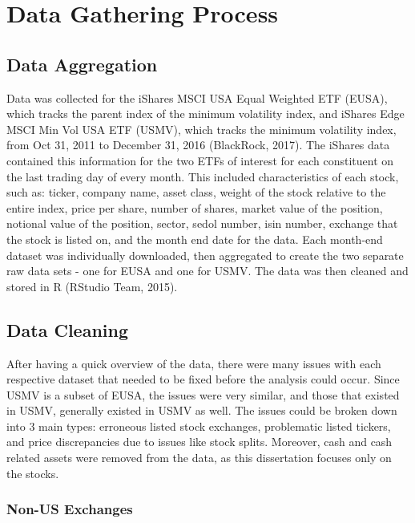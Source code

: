 \documentclass[12pt,twoside]{reedthesis}
\theoremstyle{definition}
\theoremstyle{definition}
\theoremstyle{definition}
\theoremstyle{remark}
\begin{document}
\chapter{Data Gathering Process}\label{data-gathering-process}

\section{Data Aggregation}\label{data-aggregation}

Data was collected for the iShares MSCI USA Equal Weighted ETF (EUSA),
which tracks the parent index of the minimum volatility index, and
iShares Edge MSCI Min Vol USA ETF (USMV), which tracks the minimum
volatility index, from Oct 31, 2011 to December 31, 2016 (BlackRock,
2017). The iShares data contained this information for the two ETFs of
interest for each constituent on the last trading day of every month.
This included characteristics of each stock, such as: ticker, company
name, asset class, weight of the stock relative to the entire index,
price per share, number of shares, market value of the position,
notional value of the position, sector, sedol number, isin number,
exchange that the stock is listed on, and the month end date for the
data. Each month-end dataset was individually downloaded, then
aggregated to create the two separate raw data sets - one for EUSA and
one for USMV. The data was then cleaned and stored in R (RStudio Team,
2015).

\section{Data Cleaning}\label{data-cleaning}

After having a quick overview of the data, there were many issues with
each respective dataset that needed to be fixed before the analysis
could occur. Since USMV is a subset of EUSA, the issues were very
similar, and those that existed in USMV, generally existed in USMV as
well. The issues could be broken down into 3 main types: erroneous
listed stock exchanges, problematic listed tickers, and price
discrepancies due to issues like stock splits. Moreover, cash and cash
related assets were removed from the data, as this dissertation focuses
only on the stocks.

\subsection{Non-US Exchanges}\label{non-us-exchanges}
\end{document}
